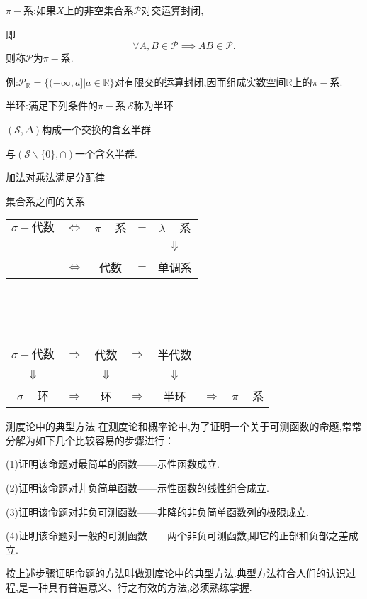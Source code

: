 $\pi-\text{系}$:如果$X$上的非空集合系$\mathcal{P}$对交运算封闭,

即\begin{equation}
\forall A,B\in\mathcal{P} \implies AB\in\mathcal{P}.
\end{equation} 
则称$\mathcal{P}$为$\pi-\text{系}$.

例:$\mathcal{P}_\mathbb{R} = \{(-\infty,a]|a\in\mathbb{R}  \}$对有限交的运算封闭,因而组成实数空间$\mathbb{R}$上的$\pi-\text{系}$.



半环:满足下列条件的$\pi-\text{系}~\mathcal{S}$称为半环

$(\mathcal{S},\Delta)$构成一个交换的含幺半群

与$(\mathcal{S}\backslash\{0\},\cap)$一个含幺半群.

加法对乘法满足分配律

{集合系之间的关系}

\begin{tabular}{ccccc}
$\sigma-\text{代数}$ & $\Longleftrightarrow$ & $\pi-\text{系}$ & $+$ & $\lambda-\text{系}$ \\
~ & ~ & ~ & ~ & $\Downarrow$ \\
~  & $\Longleftrightarrow$ & 代数 & $+$ & 单调系 \\
\end{tabular}
\\ \hspace*{\fill} \\%
\hspace*{\fill} \\%
\begin{tabular}{ccccccc}
$\sigma-\text{代数}$ & $\Longrightarrow$ & 代数 & $\Longrightarrow$ & 半代数 & ~ & ~ \\
$\Downarrow$ & ~ & $\Downarrow$ & ~ & $\Downarrow$ & ~ & ~ \\
$\sigma-\text{环}$ & $\Longrightarrow$ & 环 & $\Longrightarrow$ & 半环 & $\Longrightarrow$ & $\pi-\text{系}$
\end{tabular}


{测度论中的典型方法}
在测度论和概率论中,为了证明一个关于可测函数的命题,常常分解为如下几个比较容易的步骤进行：
\begin{blist}
\item (1)证明该命题对最简单的函数——示性函数成立.
\item (2)证明该命题对非负简单函数——示性函数的线性组合成立.
\item (3)证明该命题对非负可测函数——非降的非负简单函数列的极限成立.
\item (4)证明该命题对一般的可测函数——两个非负可测函数,即它的正部和负部之差成立.
\end{blist}
按上述步骤证明命题的方法叫做测度论中的典型方法.典型方法符合人们的认识过程,是一种具有普遍意义、行之有效的方法,必须熟练掌握.




